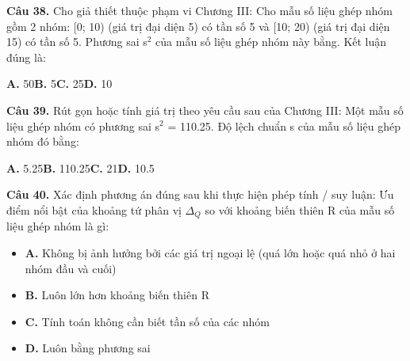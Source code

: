 \documentclass[11pt,a4paper]{article}
\begin{document}
\textbf{\color{primary} Câu 38.} Cho giả thiết thuộc phạm vi Chương III: Cho mẫu số liệu ghép nhóm gồm 2 nhóm: [0; 10) (giá trị đại diện 5) có tần số 5 và [10; 20) (giá trị đại diện 15) có tần số 5. Phương sai s$^2$ của mẫu số liệu ghép nhóm này bằng. Kết luận đúng là:\par
\hspace*{1.5em}\textbf{A.} 50\quad\quad \textbf{B.} 5\quad\quad \textbf{C.} 25\quad\quad \textbf{D.} 10\par\vspace{2pt}
\textbf{\color{primary} Câu 39.} Rút gọn hoặc tính giá trị theo yêu cầu sau của Chương III: Một mẫu số liệu ghép nhóm có phương sai s$^2$ = 110.25. Độ lệch chuẩn s của mẫu số liệu ghép nhóm đó bằng:\par
\hspace*{1.5em}\textbf{A.} 5.25\quad\quad \textbf{B.} 110.25\quad\quad \textbf{C.} 21\quad\quad \textbf{D.} 10.5\par\vspace{2pt}
\textbf{\color{primary} Câu 40.} Xác định phương án đúng sau khi thực hiện phép tính / suy luận: Ưu điểm nổi bật của khoảng tứ phân vị $\Delta_Q$ so với khoảng biến thiên R của mẫu số liệu ghép nhóm là gì:\par
\begin{itemize}\setlength{\itemsep}{1pt}\setlength{\parskip}{0pt}
  \item[] \textbf{A.} Không bị ảnh hưởng bởi các giá trị ngoại lệ (quá lớn hoặc quá nhỏ ở hai nhóm đầu và cuối)
  \item[] \textbf{B.} Luôn lớn hơn khoảng biến thiên R
  \item[] \textbf{C.} Tính toán không cần biết tần số của các nhóm
  \item[] \textbf{D.} Luôn bằng phương sai
\end{itemize}\vspace{2pt}
\end{document}
